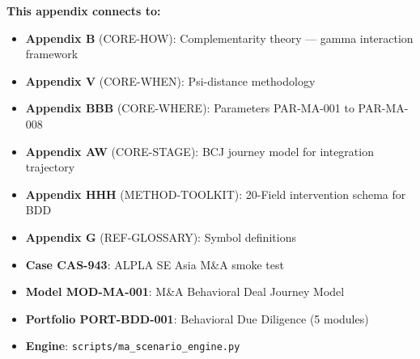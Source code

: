 
\begin{tcolorbox}[colback=blue!5!white, colframe=blue!75!black,
    title=Cross-References]
\textbf{This appendix connects to:}
\begin{itemize}[nosep]
\item \textbf{Appendix B} (CORE-HOW): Complementarity theory --- gamma interaction framework
\item \textbf{Appendix V} (CORE-WHEN): Psi-distance methodology
\item \textbf{Appendix BBB} (CORE-WHERE): Parameters PAR-MA-001 to PAR-MA-008
\item \textbf{Appendix AW} (CORE-STAGE): BCJ journey model for integration trajectory
\item \textbf{Appendix HHH} (METHOD-TOOLKIT): 20-Field intervention schema for BDD
\item \textbf{Appendix G} (REF-GLOSSARY): Symbol definitions
\item \textbf{Case CAS-943}: ALPLA SE Asia M\&A smoke test
\item \textbf{Model MOD-MA-001}: M\&A Behavioral Deal Journey Model
\item \textbf{Portfolio PORT-BDD-001}: Behavioral Due Diligence (5 modules)
\item \textbf{Engine}: \texttt{scripts/ma\_scenario\_engine.py}
\end{itemize}
\end{tcolorbox}
